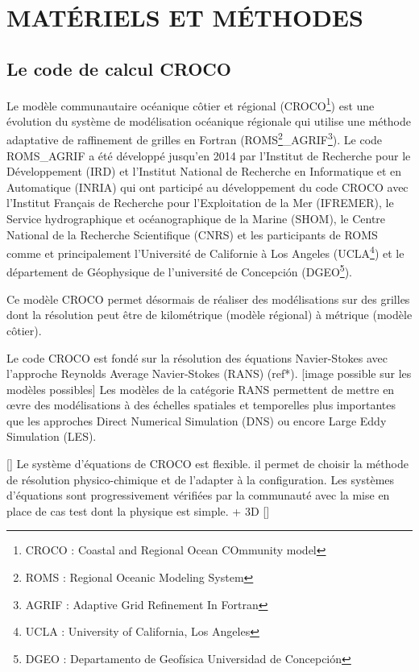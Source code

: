 \documentclass[10pt,a4paper,titlepage]{article}
\begin{document}
\newpage

\section{MATÉRIELS ET MÉTHODES}
\label{sec:materiel_methodes}
\subsection{Le code de calcul CROCO}
\label{sub:croco}
Le modèle communautaire océanique côtier et régional (CROCO\footnote{CROCO : Coastal and Regional Ocean COmmunity model}) est une évolution du système de modélisation océanique régionale qui utilise une méthode adaptative de raffinement de grilles en Fortran (ROMS\footnote{ROMS : Regional Oceanic Modeling System}\_AGRIF\footnote{AGRIF : Adaptive Grid Refinement In Fortran}).
Le code ROMS\_AGRIF a été développé jusqu'en 2014 par l'Institut de Recherche pour le Développement (IRD) et l'Institut National de Recherche en Informatique et en Automatique (INRIA) qui ont participé au développement du code CROCO avec
l'Institut Français de Recherche pour l'Exploitation de la Mer (IFREMER), 
le Service hydrographique et océanographique de la Marine (SHOM), 
le Centre National de la Recherche Scientifique (CNRS)
et les participants de ROMS comme et principalement 
l'Université de Californie à Los Angeles (UCLA\footnote{UCLA : University of California, Los Angeles}) 
et le département de Géophysique de l'université de Concepción (DGEO\footnote{DGEO : Departamento de Geofísica Universidad de Concepción}).


Ce modèle CROCO permet désormais de réaliser des modélisations sur des grilles dont la résolution peut être de kilométrique (modèle régional) à métrique (modèle côtier).

Le code CROCO est fondé sur la résolution des équations Navier-Stokes avec l'approche Reynolds Average Navier-Stokes (RANS) (ref*).
[image possible sur les modèles possibles]
Les modèles de la catégorie RANS permettent de mettre en \oe{}vre des modélisations à des échelles spatiales et temporelles plus importantes que les approches Direct Numerical Simulation (DNS) ou encore Large Eddy Simulation (LES).

[]
Le système d'équations de CROCO est flexible.
 il permet de choisir la méthode de résolution physico-chimique et de l'adapter à la configuration.
Les systèmes d'équations sont progressivement vérifiées par la communauté avec la mise en place de cas test dont la physique est simple. %
+ 3D
[]
\end{document}
